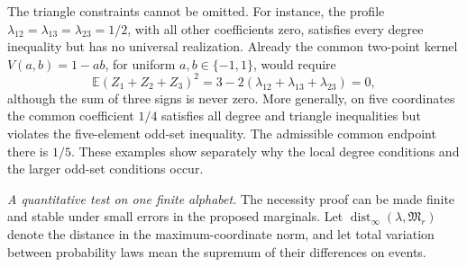 \documentclass[a4paper,11pt,reqno]{amsart}
\newcommand{\proofpart}[1]{%
  \par\smallskip\noindent\textit{#1.}\enspace\ignorespaces}
\theoremstyle{plain}
\theoremstyle{definition}
\theoremstyle{remark}
\begin{document}
The triangle constraints cannot be omitted.  For instance, the
profile $\lambda_{12}=\lambda_{13}=\lambda_{23}=1/2$, with all
other coefficients zero, satisfies every degree inequality but
has no universal realization.  Already the common two-point kernel
$V(a,b)=1-ab$, for uniform $a,b\in\{-1,1\}$, would require
\[
 \mathbb E(Z_1+Z_2+Z_3)^2
  =3-2(\lambda_{12}+\lambda_{13}+\lambda_{23})=0,
\]
although the sum of three signs is never zero.  More generally,
on five coordinates the common coefficient $1/4$ satisfies all
degree and triangle inequalities but violates the five-element
odd-set inequality.  The admissible common endpoint there is
$1/5$.  These examples show separately why the local degree
conditions and the larger odd-set conditions occur.

\proofpart{A quantitative test on one finite alphabet}
The necessity proof can be made finite and stable under small
errors in the proposed marginals.  Let
$\operatorname{dist}_\infty(\lambda,\mathfrak M_r)$ denote the
distance in the maximum-coordinate norm, and let total variation
between probability laws mean the supremum of their differences
on events.
\end{document}
